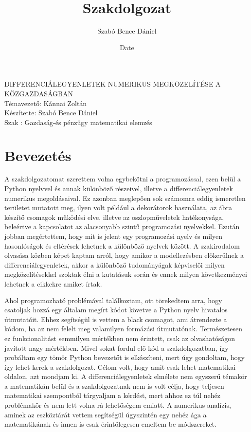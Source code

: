 \documentclass{article}
\title{Szakdolgozat}
\author{Szabó Bence Dániel }
\date{Date}
\theoremstyle{definition}
\theoremstyle{theorem}
\begin{document}
\begin{center}
\fontsize{40pt}{12pt}\selectfont

    DIFFERENCIÁLEGYENLETEK NUMERIKUS MEGKÖZELÍTÉSE A KÖZGAZDASÁGBAN\\
    \bigskip
    Témavezető: Kánnai Zoltán\\
    \bigskip
    Készítette: Szabó Bence Dániel\\
    \bigskip
    Szak : Gazdaság-és pénzügy matematikai elemzés
\end{center}

\pagebreak
\tableofcontents
\pagebreak
\section{Bevezetés}
A szakdolgozatomat szerettem volna egybekötni a programozással, ezen belül a Python nyelvvel és annak különböző részeivel, illetve a differenciálegyenletek numerikus megoldásaival. Ez azonban meglepően sok számomra eddig ismeretlen területet mutatott meg, ilyen volt például a dekorátorok használata, az ábra készítő csomagok működési elve, illetve az oszlopműveletek hatékonysága, beleértve a kapcsolatot az alacsonyabb szintű programozási nyelvekkel. Ezután jobban megértettem, hogy mit is jelent egy programozási nyelv és milyen hasonlóságok és eltérések lehetnek a különböző nyelvek között. A szakirodalom olvasása közben képet kaptam arról, hogy amikor a modellezésben előkerülnek a differenciálegyenletek, akkor a különböző tudományágak képviselői milyen megközelítésekkel szoktak élni a kutatásuk során és ennek milyen következményei lehetnek a cikkekre amiket írtak.

Ahol programozható problémával találkoztam, ott törekedtem arra, hogy csatoljak hozzá egy általam megírt kódot követve a Python nyelv hivatalos útmutatóit. Ehhez segítségül is vettem a black csomagot, ami átrendezte a kódom, ha az nem felelt meg valamilyen formázási útmutatónak. Természetesen ez funkcionalitást semmilyen mértékben nem érintett, csak az olvashatóságon javított nagy mértékben. Mivel sokat fordul elő kód a szakdolgozatban, így probáltam egy tömör Python bevezetőt is elkészíteni, mert úgy gondoltam, hogy így lehet kerek a szakdolgozat. Célom volt, hogy amit csak lehet matematikai oldalon, azt mondjam ki.  A differenciálegyenletek elmélete nem egyszerű témakör a matematikán belül és a szakdolgozatnak nem is volt célja, hogy teljesen matematikai szempontból tárgyaljam a kérdést, mert ahhoz ez túl nehéz problémakör és nem lett volna rá lehetőségem emiatt. A numerikus analízis, aminek az eszköztárát vettem segítségül úgyszintén egy nehéz ága a matematikának és innen is csak érintőlegesen emeltem be módszereket.
\end{document}
